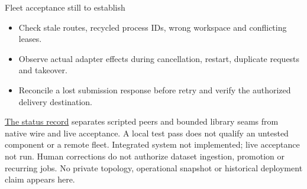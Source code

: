 \begin{frame}[label=fleet-evidence]{Fleet acceptance still to establish}
\begin{itemize}
\item Check stale routes, recycled process IDs, wrong workspace and conflicting leases.
\item Observe actual adapter effects during cancellation, restart, duplicate requests and takeover.
\item Reconcile a lost submission response before retry and verify the authorized delivery destination.
\end{itemize}
\medskip
\href{https://github.com/newdarwindev/runspindle/blob/main/STATUS.json}{The status record}
separates scripted peers and bounded library seams from native wire and live acceptance.
A local test pass does not qualify an untested component or a remote fleet.
\vfill
{\footnotesize Integrated system not implemented; live acceptance not run.
Human corrections do not authorize dataset ingestion, promotion or recurring jobs.
No private topology, operational snapshot or historical deployment claim appears here.}
\end{frame}
